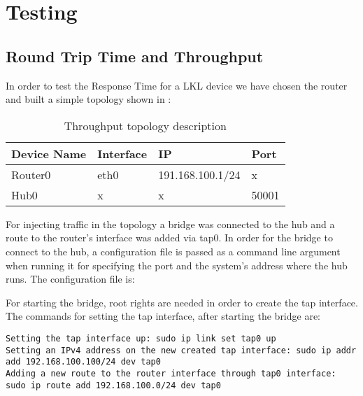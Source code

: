 \chapter{Testing}
\label{ch-testing}

\section{Round Trip Time and Throughput}
\label{sec:rt-troughput}

In order to test the Response Time for a LKL device we have chosen the router and built a simple topology shown in :
\begin{center}
  \begin{table}[htb]
  \begin{center}
  \begin{tabular}{| l | l | l | l |}
    \hline
      Device Name & Interface & IP & Port \\ \hline
      Router0 & eth0 & 191.168.100.1/24 & x \\ \hline
      Hub0 & x & x & 50001\\ \hline
    \hline
  \end{tabular}
  \end{center}
  \caption{Throughput topology description}
  \label{table:resp-time}
  \end{table}
\end{center}


For injecting traffic in the topology a bridge was connected to the hub and a route to the router's interface was added via tap0. In order for the bridge to connect to the hub, a configuration file is passed as a command line argument when running it for specifying the port and the system's address where the hub runs.
The  configuration file is: 
\lstset{language=TeX, caption=Bridge configuration file}

For starting the bridge, root rights are needed in order to create the tap interface.
The commands for setting the tap interface, after starting the bridge are:
\lstset{language=TeX,caption=Commands for configuring the tap interface,label=test-bridge-config}
\begin{lstlisting}
Setting the tap interface up: sudo ip link set tap0 up
Setting an IPv4 address on the new created tap interface: sudo ip addr add 192.168.100.100/24 dev tap0
Adding a new route to the router interface through tap0 interface: sudo ip route add 192.168.100.0/24 dev tap0
\end{lstlisting}

